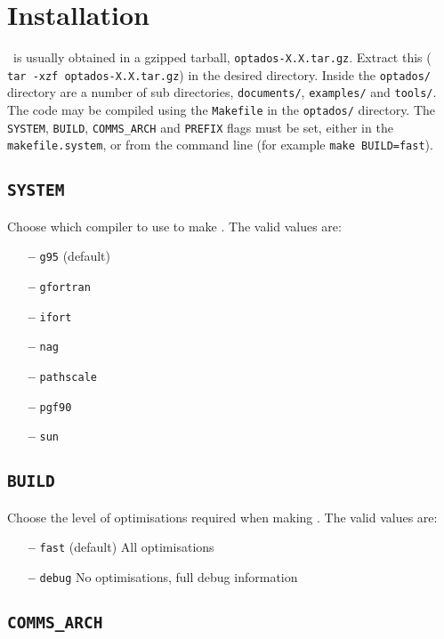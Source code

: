 \documentclass[a4paper,11pt,twoside]{book}
\begin{document}
\section{Installation}
\optados\ is usually obtained in a gzipped tarball, \verb#optados-X.X.tar.gz#. Extract this ( \verb# tar -xzf optados-X.X.tar.gz#) in the desired directory. Inside the  \verb#optados/# directory are a number of sub directories,  \verb#documents/#,   \verb#examples/# and \verb#tools/#.  The code may be compiled using the \verb#Makefile# in the  \verb#optados/# directory.  The \verb#SYSTEM#, \verb#BUILD#, \verb#COMMS_ARCH# and \verb#PREFIX# flags must be set, either in the  \verb#makefile.system#, or from the command line (for example  \verb#make BUILD=fast#).

\subsection[system]{\tt SYSTEM}

Choose which compiler to use to make \optados. The valid values are:
\begin{itemize}
\item[{\bf --}]  \verb#g95# (default)
\item[{\bf --}]  \verb#gfortran#
\item[{\bf --}]  \verb#ifort#
\item[{\bf --}]  \verb#nag#
\item[{\bf --}]  \verb#pathscale#
\item[{\bf --}]  \verb#pgf90#
\item[{\bf --}]  \verb#sun#
\end{itemize}

\subsection[build]{\tt BUILD}

Choose the level of optimisations required when making \optados.  The valid values are:
\begin{itemize}
\item[{\bf --}]  \verb#fast# (default) All optimisations
\item[{\bf --}]  \verb#debug# No optimisations, full debug information
\end{itemize}

\subsection[comms_arch]{\tt COMMS\_ARCH}
\end{document}
